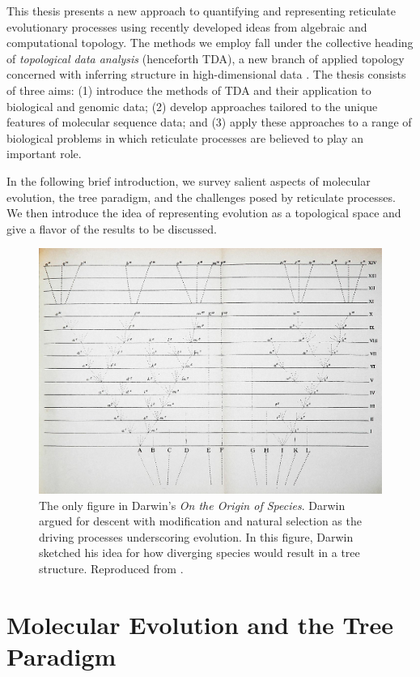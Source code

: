 This thesis presents a new approach to quantifying and representing reticulate evolutionary processes using recently developed ideas from algebraic and computational topology.
The methods we employ fall under the collective heading of \emph{topological data analysis} (henceforth TDA), a new branch of applied topology concerned with inferring structure in high-dimensional data \cite{Carlsson:2014cn}.
The thesis consists of three aims: (1) introduce the methods of TDA and their application to biological and genomic data; (2) develop approaches tailored to the unique features of molecular sequence data; and (3) apply these approaches to a range of biological problems in which reticulate processes are believed to play an important role.

In the following brief introduction, we survey salient aspects of molecular evolution, the tree paradigm, and the challenges posed by reticulate processes.
We then introduce the idea of representing evolution as a topological space and give a flavor of the results to be discussed.

\begin{figure}
\centering
\includegraphics[width=.5\columnwidth]{./fig/introduction/Darwin_divergence.jpg}
\caption[Charles Darwin's Evolutionary Tree]{The only figure in Darwin's \emph{On the Origin of Species}. Darwin argued for descent with modification and natural selection as the driving processes underscoring evolution. In this figure, Darwin sketched his idea for how diverging species would result in a tree structure. Reproduced from \cite{Darwin:1859uh}.}
\label{fig:darwin_origin}
\end{figure}

\section{Molecular Evolution and the Tree Paradigm}


